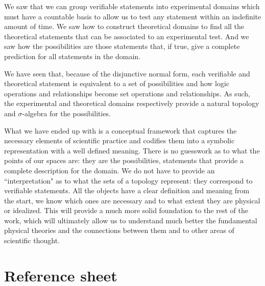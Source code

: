 	
	We saw that we can group verifiable statements into experimental domains which must have a countable basis to allow us to test any statement within an indefinite amount of time. We saw how to construct theoretical domains to find all the theoretical statements that can be associated to an experimental test. And we saw how the possibilities are those statements that, if true, give a complete prediction for all statements in the domain.
	
	We have seen that, because of the disjunctive normal form, each verifiable and theoretical statement is equivalent to a set of possibilities and how logic operations and relationships become set operations and relationships. As such, the experimental and theoretical domains respectively provide a natural topology and $\sigma$-algebra for the possibilities.
	
	What we have ended up with is a conceptual framework that captures the necessary elements of scientific practice and codifies them into a symbolic representation with a well defined meaning. There is no guesswork as to what the points of our spaces are: they are the possibilities, statements that provide a complete description for the domain. We do not have to provide an ``interpretation" as to what the sets of a topology represent: they correspond to verifiable statements. All the objects have a clear definition and meaning from the start, we know which ones are necessary and to what extent they are physical or idealized. This will provide a much more solid foundation to the rest of the work, which will ultimately allow us to understand much better the fundamental physical theories and the connections between them and to other areas of scientific thought.
	
	
	
	\newpage
	
	\section{Reference sheet}
	
